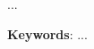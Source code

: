 \makeatletter
    \setlength{\absparsep}{18pt}
\makeatother

\begin{center}
    \textbf{\abstractitle}
\end{center}
\vspace{.5cm}

\noindent
...

\vspace{18pt}\noindent\textbf{Keywords}: ...
